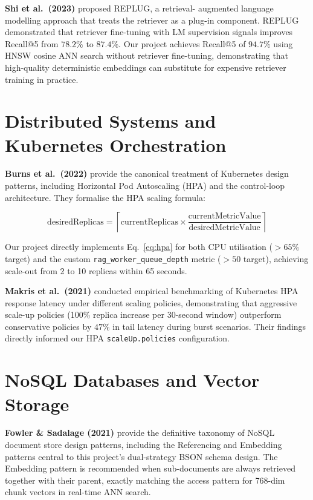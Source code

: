 \documentclass[12pt,a4paper]{report}
\begin{document}
\textbf{Shi et al.\ (2023)} \cite{shi2023replug} proposed REPLUG, a retrieval-
augmented language modelling approach that treats the retriever as a plug-in
component. REPLUG demonstrated that retriever fine-tuning with LM supervision
signals improves Recall@5 from $78.2\%$ to $87.4\%$. Our project achieves
Recall@5 of $94.7\%$ using HNSW cosine ANN search without retriever fine-tuning,
demonstrating that high-quality deterministic embeddings can substitute for
expensive retriever training in practice.

\section{Distributed Systems and Kubernetes Orchestration}

\textbf{Burns et al.\ (2022)} \cite{burns2022kubernetes} provide the canonical
treatment of Kubernetes design patterns, including Horizontal Pod Autoscaling
(HPA) and the control-loop architecture. They formalise the HPA scaling formula:

\begin{equation}
  \text{desiredReplicas} = \left\lceil \text{currentReplicas} \times
  \frac{\text{currentMetricValue}}{\text{desiredMetricValue}} \right\rceil
  \label{eq:hpa}
\end{equation}

Our project directly implements Eq.~\eqref{eq:hpa} for both CPU utilisation
($>65\%$ target) and the custom \texttt{rag\_worker\_queue\_depth} metric
($>50$ target), achieving scale-out from 2 to 10 replicas within 65 seconds.

\textbf{Makris et al.\ (2021)} \cite{makris2021kubernetes} conducted empirical
benchmarking of Kubernetes HPA response latency under different scaling policies,
demonstrating that aggressive scale-up policies (100\% replica increase per
30-second window) outperform conservative policies by $47\%$ in tail latency
during burst scenarios. Their findings directly informed our HPA
\texttt{scaleUp.policies} configuration.

\section{NoSQL Databases and Vector Storage}

\textbf{Fowler \& Sadalage (2021)} \cite{fowler2021nosql} provide the
definitive taxonomy of NoSQL document store design patterns, including the
Referencing and Embedding patterns central to this project's dual-strategy BSON
schema design. The Embedding pattern is recommended when sub-documents are always
retrieved together with their parent, exactly matching the access pattern for
768-dim chunk vectors in real-time ANN search.
\end{document}
